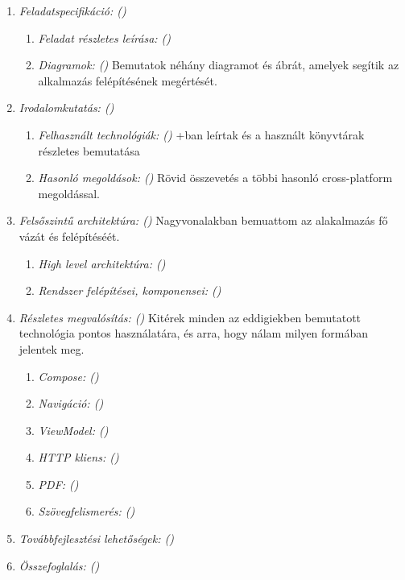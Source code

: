 \begin{enumerate}
	\item \emph{Feladatspecifikáció: ()} 
        \begin{enumerate}
            \item \emph{Feladat részletes leírása: ()} 
            \item \emph{Diagramok: ()} Bemutatok néhány diagramot és ábrát, amelyek segítik az alkalmazás felépítésének megértését.
        \end{enumerate}
	\item \emph{Irodalomkutatás: ()} 
        \begin{enumerate}
            \item \emph{Felhasznált technológiák: ()} \az+ban leírtak és a használt könyvtárak részletes bemutatása 
            \item \emph{Hasonló megoldások: ()} Rövid összevetés a többi hasonló cross-platform megoldással.
        \end{enumerate}
    \item \emph{Felsőszintű architektúra: ()} Nagyvonalakban bemuattom az alakalmazás fő vázát és felépítéséét.
        \begin{enumerate}
            \item \emph{High level architektúra: ()} 
            \item \emph{Rendszer felépítései, komponensei: ()}
        \end{enumerate}
    \item \emph{Részletes megvalósítás: ()} Kitérek minden az eddigiekben bemutatott technológia pontos használatára, és arra, hogy nálam milyen formában jelentek meg.
        \begin{enumerate}
            \item \emph{Compose: ()} 
            \item \emph{Navigáció: ()}
            \item \emph{ViewModel: ()}
            \item \emph{HTTP kliens: ()}
            \item \emph{PDF: ()}
            \item \emph{Szövegfelismerés: ()}
        \end{enumerate}
    \item \emph{Továbbfejlesztési lehetőségek: ()} 
    \item \emph{Összefoglalás: ()} 
\end{enumerate}
